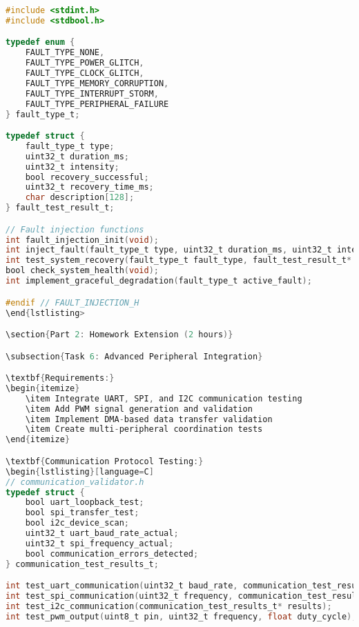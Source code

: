 \documentclass[11pt,a4paper]{article}
\begin{document}
\begin{lstlisting}[language=C]
#include <stdint.h>
#include <stdbool.h>

typedef enum {
    FAULT_TYPE_NONE,
    FAULT_TYPE_POWER_GLITCH,
    FAULT_TYPE_CLOCK_GLITCH,
    FAULT_TYPE_MEMORY_CORRUPTION,
    FAULT_TYPE_INTERRUPT_STORM,
    FAULT_TYPE_PERIPHERAL_FAILURE
} fault_type_t;

typedef struct {
    fault_type_t type;
    uint32_t duration_ms;
    uint32_t intensity;
    bool recovery_successful;
    uint32_t recovery_time_ms;
    char description[128];
} fault_test_result_t;

// Fault injection functions
int fault_injection_init(void);
int inject_fault(fault_type_t type, uint32_t duration_ms, uint32_t intensity);
int test_system_recovery(fault_type_t fault_type, fault_test_result_t* result);
bool check_system_health(void);
int implement_graceful_degradation(fault_type_t active_fault);

#endif // FAULT_INJECTION_H
\end{lstlisting>

\section{Part 2: Homework Extension (2 hours)}

\subsection{Task 6: Advanced Peripheral Integration}

\textbf{Requirements:}
\begin{itemize}
    \item Integrate UART, SPI, and I2C communication testing
    \item Add PWM signal generation and validation
    \item Implement DMA-based data transfer validation
    \item Create multi-peripheral coordination tests
\end{itemize}

\textbf{Communication Protocol Testing:}
\begin{lstlisting}[language=C]
// communication_validator.h
typedef struct {
    bool uart_loopback_test;
    bool spi_transfer_test;
    bool i2c_device_scan;
    uint32_t uart_baud_rate_actual;
    uint32_t spi_frequency_actual;
    bool communication_errors_detected;
} communication_test_results_t;

int test_uart_communication(uint32_t baud_rate, communication_test_results_t* results);
int test_spi_communication(uint32_t frequency, communication_test_results_t* results);
int test_i2c_communication(communication_test_results_t* results);
int test_pwm_output(uint8_t pin, uint32_t frequency, float duty_cycle);
\end{lstlisting}
\end{document}
